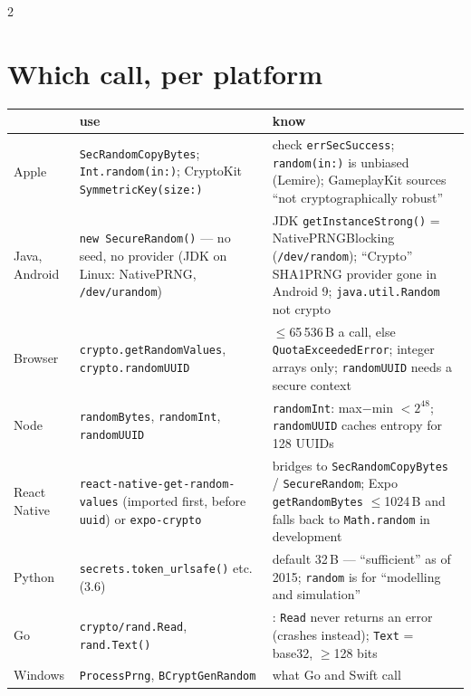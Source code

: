 \documentclass[8pt]{extarticle}
\newcommand\ct[1]{\texttt{#1}}
\begin{document}
\begin{multicols}{2}
\section{Which call, per platform}
{\scriptsize\setlength\tabcolsep{2.5pt}
\begin{tabular}{@{}>{\raggedright\arraybackslash}p{10mm}>{\raggedright\arraybackslash}p{32mm}>{\raggedright\arraybackslash}p{35mm}@{}}
\toprule
& \textbf{use} & \textbf{know}\\ \midrule
Apple & \ct{SecRandomCopyBytes}; \ct{Int.random(in:)}; CryptoKit \ct{SymmetricKey(size:)} & check \ct{errSecSuccess}; \ct{random(in:)} is unbiased (Lemire); GameplayKit sources ``not cryptographically robust''\\
Java, Android & \ct{new SecureRandom()} — no seed, no provider (JDK on Linux: NativePRNG, \ct{/dev/urandom}) & JDK \ct{getInstanceStrong()} = NativePRNGBlocking (\ct{/dev/random}); ``Crypto'' SHA1PRNG provider gone in Android 9; \ct{java.util.Random} not crypto\\
Browser & \ct{crypto.getRandomValues}, \ct{crypto.randomUUID} & $\le$65\,536\,B a call, else \ct{QuotaExceededError}; integer arrays only; \ct{randomUUID} needs a secure context\\
Node & \ct{randomBytes}, \ct{randomInt}, \ct{randomUUID} & \ct{randomInt}: max$-$min $<2^{48}$; \ct{randomUUID} caches entropy for 128 UUIDs\\
React Native & \ct{react-native-get-random-values} (imported first, before \ct{uuid}) or \ct{expo-crypto} & bridges to \ct{SecRandomCopyBytes} / \ct{SecureRandom}; Expo \ct{getRandomBytes} $\le$1024\,B and falls back to \ct{Math.random} in development\\
Python & \ct{secrets.token\_urlsafe()} etc. (3.6) & default 32\,B — ``sufficient'' as of 2015; \ct{random} is for ``modelling and simulation''\\
Go & \ct{crypto/rand.Read}, \ct{rand.Text()} & 1.24: \ct{Read} never returns an error (crashes instead); \ct{Text} = base32, $\ge$128 bits\\
Windows & \ct{ProcessPrng}, \ct{BCryptGenRandom} & what Go and Swift call\\
\bottomrule
\end{tabular}}


\end{multicols}
\end{document}
